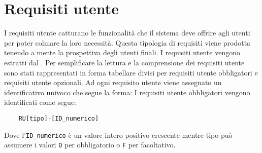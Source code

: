 \section{Requisiti utente}
\label{sec:requisiti_utente}
I requisiti utente catturano le funzionalità che il sistema deve offrire agli utenti per poter colmare la loro necessità.
Questa tipologia di requisiti viene prodotta tenendo a mente la prospettiva degli utenti finali.
I requisiti utente vengono estratti dal .
Per semplificare la lettura e la comprensione dei requisiti utente sono stati rappresentati in forma tabellare divisi per requisiti utente obbligatori e requisiti utente opzionali.
Ad ogni requisito utente viene assegnato un identificativo univoco che segue la forma:
I requisiti utente obbligatori vengono identificati come segue:
\begin{lstlisting}
    RU[tipo]-[ID_numerico]
\end{lstlisting}
Dove l'\lstinline{ID_numerico} è un valore intero positivo crescente mentre tipo può assumere i valori \lstinline{O} per obbligatorio o \lstinline{F} per facoltativo.



